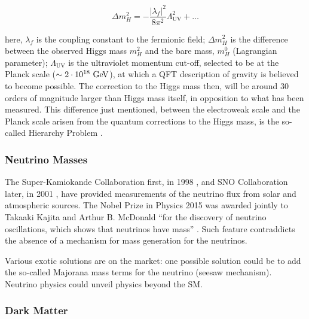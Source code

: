 
			\begin{equation}
			\label{eq:mH_fermionic_contribution}
			\Delta m_H^2 = - \frac{ | \lambda_f  |^2}{8 \pi ^2} \Lambda_{\mathrm{UV}}^2 + \dots 
			\end{equation}


			\noindent here, $\lambda_f$ is the coupling constant to the fermionic field; $\Delta m_H^2$ is the difference between the observed Higgs mass $m_H^2$ and the bare mass, $m_H^0$ (Lagrangian parameter); $\Lambda_{\mathrm{UV}}$ is the ultraviolet momentum cut-off, selected to be at the Planck scale ($\sim 2 \cdot 10^{18} \gev$), at which a QFT description of gravity is believed to become possible. The correction to the Higgs mass then, will be around 30 orders of magnitude larger than Higgs mass itself, in opposition to what has been measured. This difference just mentioned, between the electroweak scale and the Planck scale arisen from the quantum corrections to the Higgs mass, is the so-called Hierarchy Problem \cite{Weinberg1976}.


		\subsubsection*{Neutrino Masses}

			The Super-Kamiokande Collaboration first, in 1998 \cite{SK1998}, and SNO Collaboration later, in 2001 \cite{SNO2001}, have provided measurements of the neutrino flux from solar and atmospheric sources. 
			The Nobel Prize in Physics 2015 was awarded jointly to Takaaki Kajita and Arthur B. McDonald ``for the discovery of neutrino oscillations, which shows that neutrinos have mass'' \cite{Nobel2015}. Such feature contraddicts the absence of a mechanism for mass generation for the neutrinos. 

			Various exotic solutions are on the market: one possible solution could be to add the so-called Majorana mass terms for the neutrino (seesaw mechanism). Neutrino physics could unveil physics beyond the SM.



		\subsubsection*{Dark Matter}

